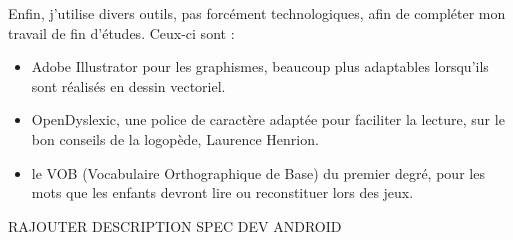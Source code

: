 Enfin, j'utilise divers outils, pas forcément technologiques, afin de compléter mon travail de fin d'études. Ceux-ci sont :
\begin{itemize}
\item Adobe Illustrator pour les graphismes, beaucoup plus adaptables lorsqu'ils sont réalisés en dessin vectoriel.
\item OpenDyslexic, une police de caractère adaptée pour faciliter la lecture, sur le bon conseils de la logopède, Laurence Henrion.
\item le VOB (Vocabulaire Orthographique de Base) du premier degré, pour les mots que les enfants devront lire ou reconstituer lors des jeux.\\
\end{itemize} 



RAJOUTER DESCRIPTION SPEC DEV ANDROID